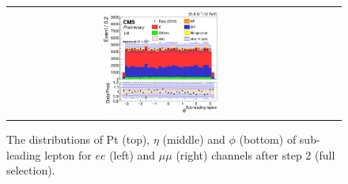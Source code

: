 \begin{figure}[ht]
\begin{center}
\begin{tabular}{ccc}
      \includegraphics[width=0.4\textwidth]{figures/tW/fig/Step2/mumu/H_lepton_sub_phi.png}\\
    \end{tabular}
    \caption{The distributions of Pt (top), $\eta$ (middle) and $\phi$ (bottom) of sub-leading lepton for $ee$ (left) and $\mu\mu$ (right) channels after step 2 (full selection).
    \label{fig:step2_subleading_lepton}}
  \end{center}
\end{figure}


